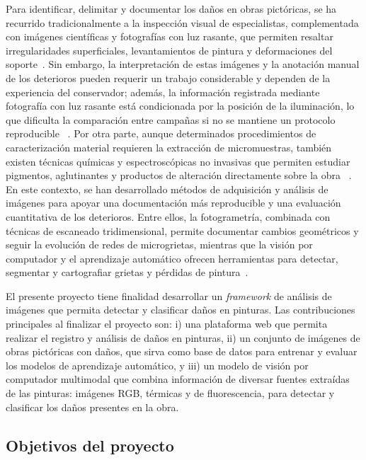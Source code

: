 Para identificar, delimitar y documentar los daños en obras pictóricas, se ha recurrido tradicionalmente a la inspección
visual de especialistas, complementada con imágenes científicas y fotografías con luz rasante, que permiten resaltar
irregularidades superficiales, levantamientos de pintura y deformaciones del soporte~\citep{Padfield2005PTM}.
Sin embargo, la interpretación de estas imágenes y la anotación manual de los deterioros pueden requerir un trabajo considerable
y dependen de la experiencia del conservador; además, la información registrada mediante fotografía con luz rasante
está condicionada por la posición de la iluminación, lo que dificulta la comparación entre campañas si no se mantiene
un protocolo reproducible~ \citep{VanVijle2025PaintingConservation}. Por otra parte, aunque determinados procedimientos de
caracterización material requieren la extracción de micromuestras, también existen técnicas químicas y
espectroscópicas no invasivas que permiten estudiar pigmentos, aglutinantes y productos de alteración directamente sobre
la obra ~\citep{Miliani2010MOLAB}. En este contexto, se han desarrollado métodos de adquisición
y análisis de imágenes para apoyar una documentación más reproducible y una evaluación cuantitativa de los deterioros.
Entre ellos, la fotogrametría, combinada con técnicas de escaneado tridimensional, permite documentar cambios geométricos
y seguir la evolución de redes de microgrietas, mientras que la visión por computador y el aprendizaje automático ofrecen
herramientas para detectar, segmentar y cartografiar grietas y pérdidas de pintura~\citep{Degrigny2020WallPaintings}.

El presente proyecto tiene finalidad desarrollar un \emph{framework} de análisis de imágenes que 
permita detectar y clasificar daños en pinturas. Las contribuciones principales al finalizar el proyecto son: 
i) una plataforma web que permita realizar el registro y análisis de daños en pinturas, ii) un conjunto de imágenes 
de obras pictóricas con daños, que sirva como base de datos para entrenar y evaluar los modelos de aprendizaje automático, y
iii) un modelo de visión por computador multimodal que combina información de diversar fuentes extraídas 
de las pinturas: imágenes RGB, térmicas y de fluorescencia, para detectar y clasificar los daños presentes 
en la obra.




\subsection{Objetivos del proyecto}

